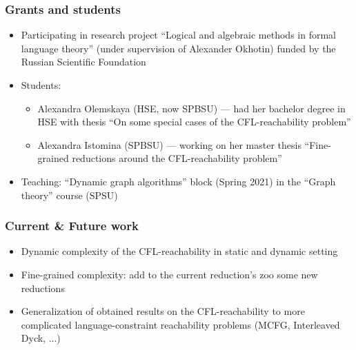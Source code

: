 \documentclass{beamer}
\begin{document}
\begin{frame}
\frametitle{Grants and students}
\begin{itemize}
\item Participating in research project ``Logical and algebraic methods in formal language theory'' (under supervision of Alexander Okhotin) funded by the Russian Scientific Foundation
\item Students: 
\begin{itemize}
\item Alexandra Olemskaya (HSE, now SPBSU) --- had her bachelor degree in HSE with thesis ``On some special cases of the CFL-reachability problem''
\item Alexandra Istomina (SPBSU)  --- working on her master thesis ``Fine-grained reductions around the CFL-reachability problem''
\end{itemize}
\item Teaching: ``Dynamic graph algorithms'' block (Spring 2021) in the ``Graph theory'' course (SPSU)
\end{itemize}
\end{frame}
\begin{frame}
\frametitle{Current \& Future work}
\begin{itemize}
\item Dynamic complexity of the CFL-reachability in static and dynamic setting
\item Fine-grained complexity: add to the current reduction's zoo some new reductions
\item Generalization of obtained results on the CFL-reachability to more complicated language-constraint reachability problems (MCFG, Interleaved Dyck, ...)
\end{itemize}

\end{frame}
\end{document}
